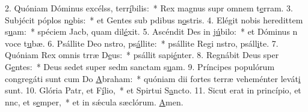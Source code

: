 2. Quóniam Dóminus excélss, terr\uline{í}bilis:~* Rex magnus supr omnem t\uline{e}rram.
3. Subjécit póplos n\uline{o}bis:~* et Gentes sub pdibus n\uline{o}stris.
4. Elégit nobis heredittem s\uline{u}am:~* spéciem Jacb, quam dil\uline{é}xit.
5. Ascéndit Des in j\uline{ú}bilo:~* et Dóminus n voce t\uline{u}bæ.
6. Psállite Deo nstro, ps\uline{á}llite:~* psállite Regi nstro, psáll\uline{i}te.
7. Quóniam Rex omnis trræ D\uline{e}us:~* psállit sapi\uline{é}nter.
8. Regnábit Deus sper G\uline{e}ntes:~* Deus sedet super sedm sanctam s\uline{u}am.
9. Príncipes populórum congregáti sunt cum Do \uline{A}braham:~* quóniam dii fortes terræ veheménter levát\uline{i} sunt.
10. Glória Patr, et F\uline{í}lio,~* et Spirtui S\uline{a}ncto.
11. Sicut erat in princípio, et nnc, et s\uline{e}mper,~* et in sǽcula sæclórum. \uline{A}men.
